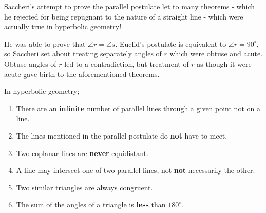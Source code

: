 \documentclass{book}
\begin{document}
\vspace{10pt}

Saccheri's attempt to prove the parallel postulate let to many theorems - which he rejected for being repugnant to the nature of a straight line - which were actually true in hyperbolic geometry!


\begin{center}
\end{center}

\vspace{10pt}

He was able to prove that $\angle r=\angle s$. Euclid's postulate is equivalent to $\angle r=90^\circ$, so Saccheri set about treating separately angles of $r$ which were obtuse and acute. Obtuse angles of $r$ led to a contradiction, but treatment of $r$ as though it were acute gave birth to the aforementioned theorems.

\vspace{10pt}

In hyperbolic geometry;

\begin{enumerate}[label=(\alph*)]
\item There are an {\bf{}infinite} number of parallel lines through a given point not on a line.
\item The lines mentioned in the parallel postulate do {\bf{}not} have to meet.
\item Two coplanar lines are {\bf{}never} equidistant.
\item A line may intersect one of two parallel lines, not {\bf{}not} necessarily the other.
\item Two similar triangles are always congruent.
\item The sum of the angles of a triangle is {\bf{}less} than $180^\circ$.
\end{enumerate}
\end{document}
